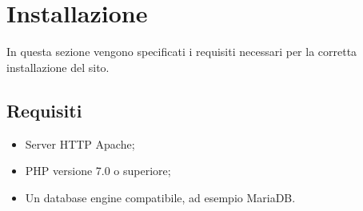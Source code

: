 \section{Installazione}
In questa sezione vengono specificati i requisiti necessari per la corretta installazione del sito.
\subsection{Requisiti}
\begin{itemize}
\item Server HTTP Apache;
\item PHP versione 7.0 o superiore;
\item Un database engine compatibile, ad esempio MariaDB.
\end{itemize}